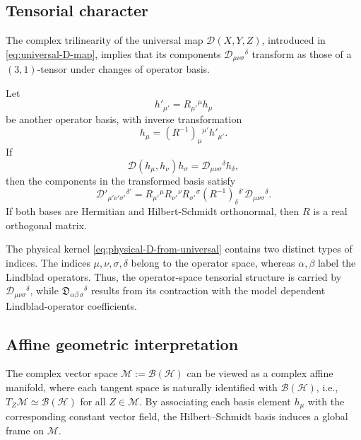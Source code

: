\documentclass[notitlepage,aip,reprint,onecolumn]{revtex4-1}
\theoremstyle{definition}
\begin{document}
\subsection{Tensorial character}

The complex trilinearity of the universal map \(\mathcal D(X,Y,Z)\), introduced in \eqref{eq:universal-D-map}, implies that its components \(\mathcal D_{\mu\nu\sigma}{}^\delta\) transform as those of a \((3,1)\)-tensor under changes of operator basis.

Let
\[
    h'_{\mu'}
    =
    R_{\mu'}{}^\mu h_\mu
\]
be another operator basis, with inverse transformation
\[
    h_\mu
    =
    (R^{-1})_\mu{}^{\mu'}h'_{\mu'}.
\]
If
\[
    \mathcal D(h_\mu,h_\nu)h_\sigma
    =
    \mathcal D_{\mu\nu\sigma}{}^\delta h_\delta,
\]
then the components in the transformed basis satisfy
\begin{equation}\label{eq:D-tensor-transformation}
    \mathcal D'_{\mu'\nu'\sigma'}{}^{\delta'}
    =
    R_{\mu'}{}^\mu
    R_{\nu'}{}^\nu
    R_{\sigma'}{}^\sigma
    (R^{-1})_\delta{}^{\delta'}
    \mathcal D_{\mu\nu\sigma}{}^\delta.
\end{equation}
If both bases are Hermitian and Hilbert-Schmidt orthonormal, then \(R\) is a real orthogonal matrix.

The physical kernel \eqref{eq:physical-D-from-universal} contains two distinct types of indices. The indices \(\mu,\nu,\sigma,\delta\) belong to the operator space, whereas \(\alpha,\beta\) label the Lindblad operators. Thus, the operator-space tensorial structure is carried by \(\mathcal D_{\mu\nu\sigma}{}^\delta\), while \(\mathfrak{D}_{\alpha\beta\,\sigma}{}^\delta\) results from its contraction
with the model dependent Lindblad-operator coefficients.

\subsection{Affine geometric interpretation}

The complex vector space \(\mathcal M := \mathcal B(\mathcal H)\) can be viewed as a complex affine manifold, where each tangent space is naturally identified with \(\mathcal B(\mathcal H)\), i.e., \(T_Z\mathcal M \simeq \mathcal B(\mathcal H)\) for all \(Z \in \mathcal M\). By associating each basis element \(h_\mu\) with the corresponding constant vector field, the Hilbert–Schmidt basis induces a global frame on \(\mathcal M\).
\end{document}
